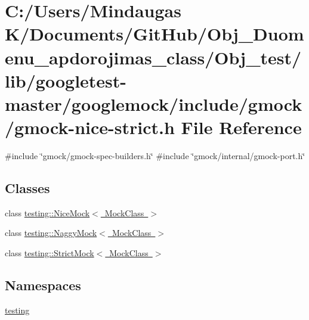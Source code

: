 \hypertarget{_obj__test_2lib_2googletest-master_2googlemock_2include_2gmock_2gmock-nice-strict_8h}{}\section{C\+:/\+Users/\+Mindaugas K/\+Documents/\+Git\+Hub/\+Obj\+\_\+\+Duomenu\+\_\+apdorojimas\+\_\+class/\+Obj\+\_\+test/lib/googletest-\/master/googlemock/include/gmock/gmock-\/nice-\/strict.h File Reference}
\label{_obj__test_2lib_2googletest-master_2googlemock_2include_2gmock_2gmock-nice-strict_8h}
{\ttfamily \#include \char`\"{}gmock/gmock-\/spec-\/builders.\+h\char`\"{}}\newline
{\ttfamily \#include \char`\"{}gmock/internal/gmock-\/port.\+h\char`\"{}}\newline
\subsection*{Classes}
\begin{DoxyCompactItemize}
\item 
class \mbox{\hyperlink{classtesting_1_1_nice_mock}{testing\+::\+Nice\+Mock$<$ Mock\+Class $>$}}
\item 
class \mbox{\hyperlink{classtesting_1_1_naggy_mock}{testing\+::\+Naggy\+Mock$<$ Mock\+Class $>$}}
\item 
class \mbox{\hyperlink{classtesting_1_1_strict_mock}{testing\+::\+Strict\+Mock$<$ Mock\+Class $>$}}
\end{DoxyCompactItemize}
\subsection*{Namespaces}
\begin{DoxyCompactItemize}
\item 
 \mbox{\hyperlink{namespacetesting}{testing}}
\end{DoxyCompactItemize}

